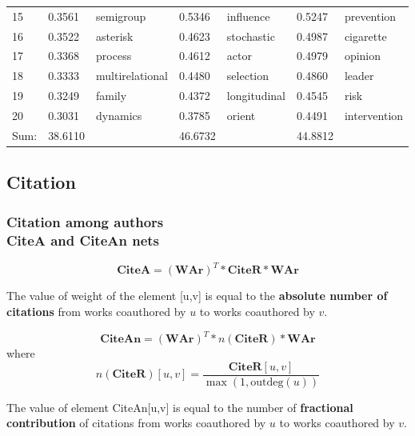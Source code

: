 \documentclass[hyperref={pdfstartview={FitBH -32768},
                         pdfpagemode=FullScreen,
                         plainpages=false,
                         colorlinks=true}
              ]{beamer}
\begin{document}
\begin{frame}[fragile]
\begin{center}
\begin{tabular}{p{0.5cm}|p{0.8cm}|p{1.7cm}||p{0.8cm}|p{1.4cm}||p{0.8cm}|p{1.6cm}}
          15   & 	0.3561  &  semigroup	    &	0.5346  &	 influence	    &	    0.5247  &	 prevention	   \\
          16   & 	0.3522  &  asterisk	    &	0.4623  &	 stochastic	    &	    0.4987  &	 cigarette	   \\
          17   & 	0.3368  &  process	    &	0.4612  &	 actor		    &	    0.4979  &	 opinion	   \\
          18   & 	0.3333  &  multirelational  &	0.4480  &	 selection	    &	    0.4860  &	 leader	   \\
          19   & 	0.3249  &  family	    &	0.4372  &	 longitudinal	    &	    0.4545  &	 risk	   \\
          20   & 	0.3031  &  dynamics	    &	0.3785  &	 orient		    &	    0.4491  &	 intervention  \\ \hline
       Sum:    & 38.6110	& 		    &	46.6732 &	&       	    44.8812&	 	   \\ \hline
\end{tabular}
\end{center}

\end{frame}

\subsection{Citation} 

\begin{frame}[fragile]
\frametitle{Citation among authors \\ \normalsize CiteA and CiteAn nets}
\footnotesize

\[ \mathbf{CiteA} = (\mathbf{WAr}) ^ T * \mathbf{CiteR} * \mathbf{WAr} \] 

The value of weight of the element [u,v] is equal to the \textbf{absolute number of citations} from works coauthored by $u$ to works coauthored by $v$. \smallskip

\[ \mathbf{CiteAn} = (\mathbf{WAr}) ^ T * n(\mathbf{CiteR}) * \mathbf{WAr} \]  
where 
\[ n(\mathbf{CiteR})[u,v] = \frac {\mathbf{CiteR}[u,v]}{\max(1,\textrm{outdeg}(u))}\]

The value of element CiteAn[u,v] is equal to the number of \textbf{fractional contribution} of citations from works coauthored by $u$ to works coauthored by $v$.\smallskip

\end{frame}
\end{document}
